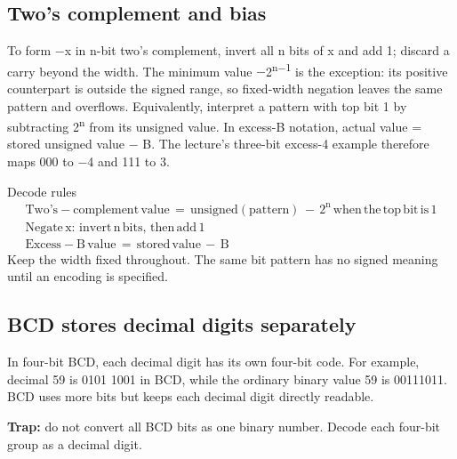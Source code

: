 \documentclass[11pt]{article}
\begin{document}
\begin{keepsection}
\begin{keepsection}
\subsection{Two’s complement and bias}

To form \ensuremath{-}x in n-bit two’s complement, invert all n bits of x and add 1; discard a carry beyond the width. The minimum value \ensuremath{-}2\textsuperscript{n\ensuremath{-}1} is the exception: its positive counterpart is outside the signed range, so fixed-width negation leaves the same pattern and overflows. Equivalently, interpret a pattern with top bit 1 by subtracting 2\textsuperscript{n} from its unsigned value. In excess-B notation, actual value = stored unsigned value \ensuremath{-} B. The lecture’s three-bit excess-4 example therefore maps 000 to \ensuremath{-}4 and 111 to 3.

\begin{equationcard}{Decode rules}
\[ \begin{gathered} \text{Two}’\mathrm{s}-\text{complement}\, \text{value}\, =\, \text{unsigned}(\text{pattern})\, -\, 2^{\mathrm{n}}\, \text{when}\, \text{the}\, \text{top}\, \text{bit}\, \text{is}\, 1 \\ \text{Negate}\, \mathrm{x}:\, \text{invert}\, \mathrm{n}\, \text{bits},\, \text{then}\, \text{add}\, 1 \\ \text{Excess}-\mathrm{B}\, \text{value}\, =\, \text{stored}\, \text{value}\, -\, \mathrm{B} \end{gathered} \]
{\small Keep the width fixed throughout. The same bit pattern has no signed meaning until an encoding is specified.}
\end{equationcard}
\end{keepsection}

\begin{keepsection}
\subsection{BCD stores decimal digits separately}

In four-bit BCD, each decimal digit has its own four-bit code. For example, decimal 59 is 0101 1001 in BCD, while the ordinary binary value 59 is 00111011. BCD uses more bits but keeps each decimal digit directly readable.

\begin{notebox}\textbf{Trap:} do not convert all BCD bits as one binary number. Decode each four-bit group as a decimal digit.\end{notebox}


\end{keepsection}
\end{keepsection}
\end{document}
